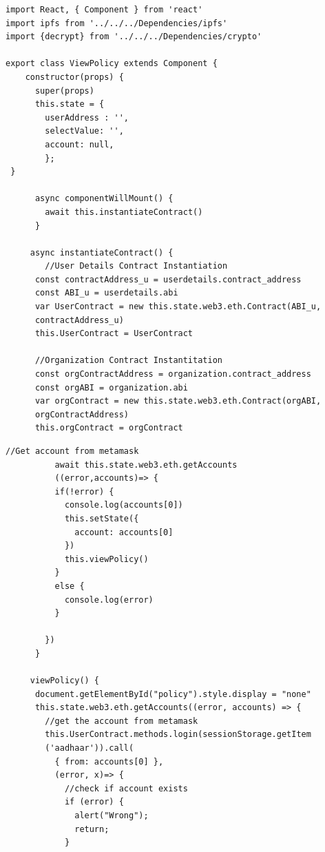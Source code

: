 \clearpage
{}
\begin{lstlisting}[frame=single]
import React, { Component } from 'react'
import ipfs from '../../../Dependencies/ipfs'
import {decrypt} from '../../../Dependencies/crypto'

export class ViewPolicy extends Component {
    constructor(props) {
      super(props)
      this.state = {
        userAddress : '',
        selectValue: '',
        account: null,
        };
 }

      async componentWillMount() {        
        await this.instantiateContract()
      }

     async instantiateContract() {
        //User Details Contract Instantiation
      const contractAddress_u = userdetails.contract_address       
      const ABI_u = userdetails.abi              
      var UserContract = new this.state.web3.eth.Contract(ABI_u,
      contractAddress_u)     
      this.UserContract = UserContract
      
      //Organization Contract Instantitation
      const orgContractAddress = organization.contract_address
      const orgABI = organization.abi
      var orgContract = new this.state.web3.eth.Contract(orgABI,
      orgContractAddress)
      this.orgContract = orgContract
      \end{lstlisting}
    \clearpage
    \begin{lstlisting}[frame=single]  
      //Get account from metamask
          await this.state.web3.eth.getAccounts
          ((error,accounts)=> {
          if(!error) {
            console.log(accounts[0])
            this.setState({
              account: accounts[0]
            })
            this.viewPolicy()
          }
          else {
            console.log(error)
          }
   
        })              
      }
  
     viewPolicy() {
      document.getElementById("policy").style.display = "none"
      this.state.web3.eth.getAccounts((error, accounts) => {
        //get the account from metamask 
        this.UserContract.methods.login(sessionStorage.getItem
        ('aadhaar')).call(
          { from: accounts[0] },
          (error, x)=> {
            //check if account exists
            if (error) {
              alert("Wrong");
              return;
            }
               \end{lstlisting}
    \clearpage
